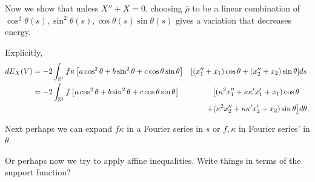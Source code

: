 \documentclass[12pt]{article}
\begin{document}
Now we show that unless \(X'' + X = 0\), choosing \(\bar{\rho}\) to be a linear combination of \(\cos^2\theta(s), \sin^2\theta(s), \cos\theta(s)\sin\theta(s)\) gives a variation that decreases energy.

Explicitly,
\begin{align*}
dE_X (V) &= -2 \int_{\operatorname{\mathbb{S}^1}} f\kappa\left[a \cos^2\theta + b \sin^2\theta + c \cos\theta \sin\theta\right] & \left[(x_1'' + x_1) \cos\theta + (x_2'' + x_2) \sin\theta \right] & ds \\
&= -2 \int_{\operatorname{\mathbb{S}^1}} f\left[a \cos^2\theta + b \sin^2\theta + c \cos\theta \sin\theta\right] & \big[(\kappa^2 x_1'' + \kappa\kappa' x_1 ' + x_1) \cos\theta & \\
&\quad & + (\kappa^2 x_2'' + \kappa\kappa' x_2 ' + x_2) \sin\theta \big] & d\theta.
\end{align*}

{\color{red} Next perhaps we can expand \(f\kappa\) in a Fourier series in \(s\) or \(f, \kappa\) in Fourier series' in \(\theta\).}

{\color{red}Or perhaps now we try to apply affine inequalities. Write things in terms of the support function?}
\end{document}
